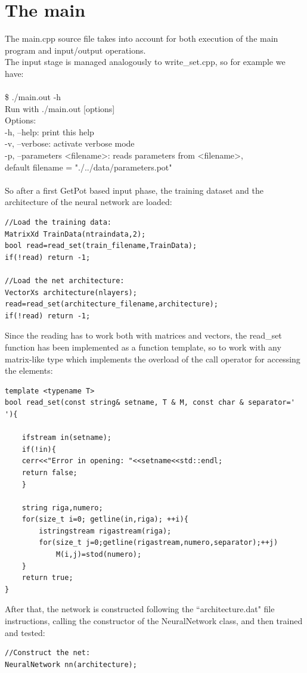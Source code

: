 \documentclass[12pt, a4paper]{report}
\theoremstyle{definition}
\begin{document}
{\section{The main}
The {\ttfamily main.cpp} source file takes into account for both execution of the main program and input/output operations.\\
The input stage is managed analogously to {\ttfamily write\_set.cpp}, so for example we have:\\
{\\ \ttfamily 
	\$ ./main.out -h\\
	Run with ./main.out [options]\\
	Options:\\
	-h, --help: print this help\\
	-v, --verbose: activate verbose mode\\
	-p, --parameters <filename>: reads parameters from <filename>,\\
	default filename = "./../data/parameters.pot"\\
	 \\}
So after a first GetPot based input phase, the training dataset and the architecture of the neural network are loaded:
\begin{lstlisting}[frame=single]
//Load the training data:
MatrixXd TrainData(ntraindata,2);
bool read=read_set(train_filename,TrainData);
if(!read) return -1;

//Load the net architecture:
VectorXs architecture(nlayers);
read=read_set(architecture_filename,architecture);
if(!read) return -1;
\end{lstlisting}
Since the reading has to work both with matrices and vectors, the read\_set function has been implemented as a function template, so to work with any matrix-like type which implements the overload of the call operator for accessing the elements:
\begin{lstlisting}[frame=single, showstringspaces=false]
template <typename T> 
bool read_set(const string& setname, T & M, const char & separator=' '){

	ifstream in(setname);
	if(!in){
	cerr<<"Error in opening: "<<setname<<std::endl;
	return false;
	}

	string riga,numero;
	for(size_t i=0; getline(in,riga); ++i){
		istringstream rigastream(riga);
		for(size_t j=0;getline(rigastream,numero,separator);++j)
			M(i,j)=stod(numero);
	}
	return true;
}
\end{lstlisting}
After that, the network is constructed following the ``architecture.dat" file instructions, calling the constructor of the NeuralNetwork class, and then trained and tested:
\begin{lstlisting}[frame=single]
//Construct the net:
NeuralNetwork nn(architecture);


\end{lstlisting}}
\end{document}
